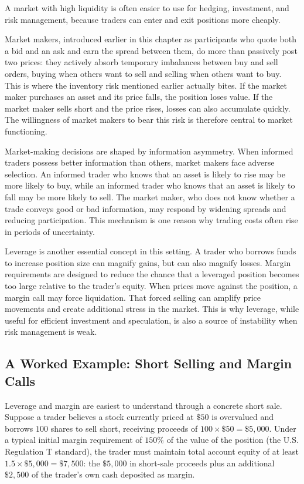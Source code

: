 \documentclass[../ai_in_finance]{subfiles}
\begin{document}
A market with high liquidity is often easier to use for hedging, investment, and risk management, because traders can enter and exit positions more cheaply.

Market makers, introduced earlier in this chapter as participants who quote both a bid and an ask and earn the spread between them, do more than passively post two prices: they actively absorb temporary imbalances between buy and sell orders, buying when others want to sell and selling when others want to buy. This is where the inventory risk mentioned earlier actually bites. If the market maker purchases an asset and its price falls, the position loses value. If the market maker sells short and the price rises, losses can also accumulate quickly. The willingness of market makers to bear this risk is therefore central to market functioning.

Market-making decisions are shaped by information asymmetry. When informed traders possess better information than others, market makers face adverse selection. An informed trader who knows that an asset is likely to rise may be more likely to buy, while an informed trader who knows that an asset is likely to fall may be more likely to sell. The market maker, who does not know whether a trade conveys good or bad information, may respond by widening spreads and reducing participation. This mechanism is one reason why trading costs often rise in periods of uncertainty.

Leverage is another essential concept in this setting. A trader who borrows funds to increase position size can magnify gains, but can also magnify losses. Margin requirements are designed to reduce the chance that a leveraged position becomes too large relative to the trader's equity. When prices move against the position, a margin call may force liquidation. That forced selling can amplify price movements and create additional stress in the market. This is why leverage, while useful for efficient investment and speculation, is also a source of instability when risk management is weak.

\subsection{A Worked Example: Short Selling and Margin Calls}
\label{sec:short-selling-margin}

Leverage and margin are easiest to understand through a concrete short sale. Suppose a trader believes a stock currently priced at $\$50$ is overvalued and borrows $100$ shares to sell short, receiving proceeds of $100 \times \$50 = \$5{,}000$. Under a typical initial margin requirement of $150\%$ of the value of the position (the U.S. Regulation T standard), the trader must maintain total account equity of at least $1.5 \times \$5{,}000 = \$7{,}500$: the $\$5{,}000$ in short-sale proceeds plus an additional $\$2{,}500$ of the trader's own cash deposited as margin.
\end{document}
